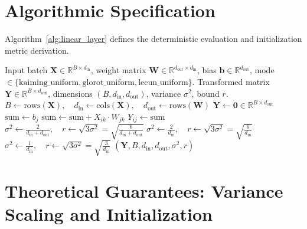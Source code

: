 \documentclass[11pt]{article}
\begin{document}
\section{Algorithmic Specification}
\label{sec:algorithm}

Algorithm~\ref{alg:linear_layer} defines the deterministic evaluation and initialization metric derivation.

\begin{algorithm}[H]
\caption{Affine Matrix Multiplication and Variance Scaling Calculation}
\label{alg:linear_layer}
\begin{algorithmic}[1]
\Require Input batch $\mathbf{X} \in \mathbb{R}^{B \times d_{\text{in}}}$, weight matrix $\mathbf{W} \in \mathbb{R}^{d_{\text{out}} \times d_{\text{in}}}$, bias $\mathbf{b} \in \mathbb{R}^{d_{\text{out}}}$, mode $\in \{\text{kaiming\_uniform}, \text{glorot\_uniform}, \text{lecun\_uniform}\}$.
\Ensure Transformed matrix $\mathbf{Y} \in \mathbb{R}^{B \times d_{\text{out}}}$, dimensions $(B, d_{\text{in}}, d_{\text{out}})$, variance $\sigma^2$, bound $r$.
\State $B \gets \text{rows}(\mathbf{X}), \quad d_{\text{in}} \gets \text{cols}(\mathbf{X}), \quad d_{\text{out}} \gets \text{rows}(\mathbf{W})$
\State $\mathbf{Y} \gets \mathbf{0} \in \mathbb{R}^{B \times d_{\text{out}}}$
        \State $\text{sum} \gets b_j$
            \State $\text{sum} \gets \text{sum} + X_{ik} \cdot W_{jk}$
        \EndFor
        \State $Y_{ij} \gets \text{sum}$
    \EndFor
\EndFor
{}
    \State $\sigma^2 \gets \frac{2}{d_{\text{in}} + d_{\text{out}}}, \quad r \gets \sqrt{3 \sigma^2} = \sqrt{\frac{6}{d_{\text{in}} + d_{\text{out}}}}$
    \State $\sigma^2 \gets \frac{2}{d_{\text{in}}}, \quad r \gets \sqrt{3 \sigma^2} = \sqrt{\frac{6}{d_{\text{in}}}}$
    \State $\sigma^2 \gets \frac{1}{d_{\text{in}}}, \quad r \gets \sqrt{3 \sigma^2} = \sqrt{\frac{3}{d_{\text{in}}}}$
\EndIf
\State \Return $(\mathbf{Y}, B, d_{\text{in}}, d_{\text{out}}, \sigma^2, r)$
\end{algorithmic}
\end{algorithm}

\section{Theoretical Guarantees: Variance Scaling and Initialization}
\label{sec:correctness}
\end{document}
